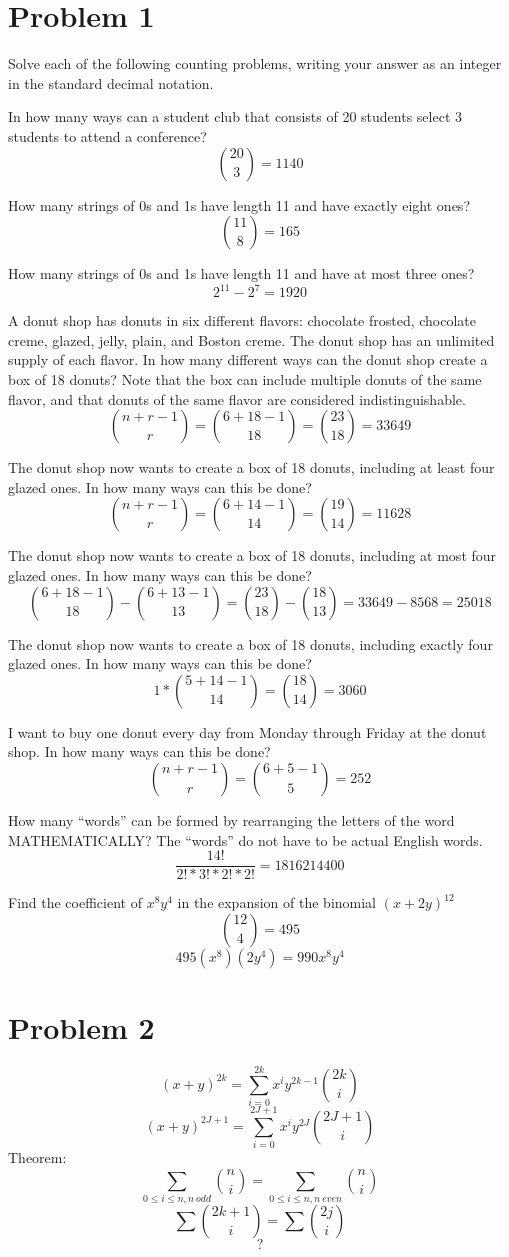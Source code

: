 \documentclass{article}
\newenvironment{problem}[1]{
  \nobreak\section*{Problem #1}
}{}
\begin{document}
  \begin{problem}{1}
    Solve each of the following counting problems, writing your answer as an integer in the standard decimal notation.\par
    In how many ways can a student club that consists of 20 students select 3 students to attend a conference?
    $$\binom{20}{3} = 1140$$

    How many strings of 0s and 1s have length 11 and have exactly eight ones?
    $$\binom{11}{8} = 165$$

    How many strings of 0s and 1s have length 11 and have at most three ones?
    $$2^{11} - 2^{7} = 1920$$

    A donut shop has donuts in six different flavors: chocolate frosted, chocolate creme, glazed, jelly, plain, and Boston creme. The donut shop has an unlimited supply of each flavor. In how many different ways can the donut shop create a box of 18 donuts? Note that the box can include multiple donuts of the same flavor, and that donuts of the same flavor are considered indistinguishable.
    $$\binom{n + r - 1}{r} = \binom{6 + 18 - 1}{18} = \binom{23}{18} = 33649$$

    The donut shop now wants to create a box of 18 donuts, including at least four glazed ones. In how many ways can this be done?
    $$\binom{n + r - 1}{r} = \binom{6 + 14 - 1}{14} = \binom{19}{14} = 11628$$

    The donut shop now wants to create a box of 18 donuts, including at most four glazed ones. In how many ways can this be done?
    $$\binom{6 + 18 - 1}{18} - \binom{6 + 13 - 1}{13}= \binom{23}{18} - \binom{18}{13} = 33649 - 8568 = 25018$$

    The donut shop now wants to create a box of 18 donuts, including exactly four glazed ones. In how many ways can this be done?
    $$1 * \binom{5 + 14 - 1}{14} = \binom{18}{14} = 3060$$

    I want to buy one donut every day from Monday through Friday at the donut shop. In how many ways can this be done?
    $$\binom{n + r - 1}{r} = \binom{6 + 5 - 1}{5} = 252$$

    How many “words” can be formed by rearranging the letters of the word MATHEMATICALLY? The “words” do not have to be actual English words.
    $$\frac{14!}{2! * 3! * 2! * 2!} = 1816214400$$

    Find the coefficient of $x^8y^4$ in the expansion of the binomial $(x + 2y)^{12}$
    $$\binom{12}{4} = 495$$
    $$495(x^8)(2y^4) = 990x^8y^4$$
  \end{problem}

  \begin{problem}{2}
    $$(x + y)^{2k} = \sum_{i=0}^{2k} x^i y^{2k - 1} \binom{2k}{i}$$
    $$(x + y)^{2J + 1} = \sum_{i=0}^{2J + 1} x^i y^{2J} \binom{2J + 1}{i}$$
    Theorem: $$\sum_{0 \le i \le n, n\ odd} \binom{n}{i} = \sum_{0 \le i \le n, n\ even} \binom{n}{i}$$
    $$\sum \binom{2k+1}{i} = \sum \binom{2j}{i}$$
    $$?$$
  \end{problem}
\end{document}
